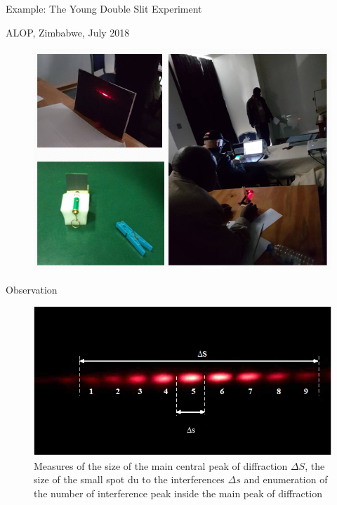 \documentclass[9pt]{beamer}
\begin{document}
\begin{frame}{Example: The Young Double Slit Experiment}
	\begin{block}{ALOP, Zimbabwe, July 2018}
		\centering
		\begin{figure}
			\includegraphics[width=.7\linewidth]{images/alop2018}
		\end{figure}
	\end{block}
\end{frame}
\begin{frame}{Observation}
	\centering
	\begin{figure}
		\includegraphics[width=.9\linewidth]{images/Image1}
		\caption{Measures of the size of the main central peak of diffraction $\Delta S$, the size of the small spot du to the interferences $\Delta s$ and enumeration of the number of interference peak inside the main peak of diffraction
		}
	\end{figure}

\end{frame}
\end{document}
